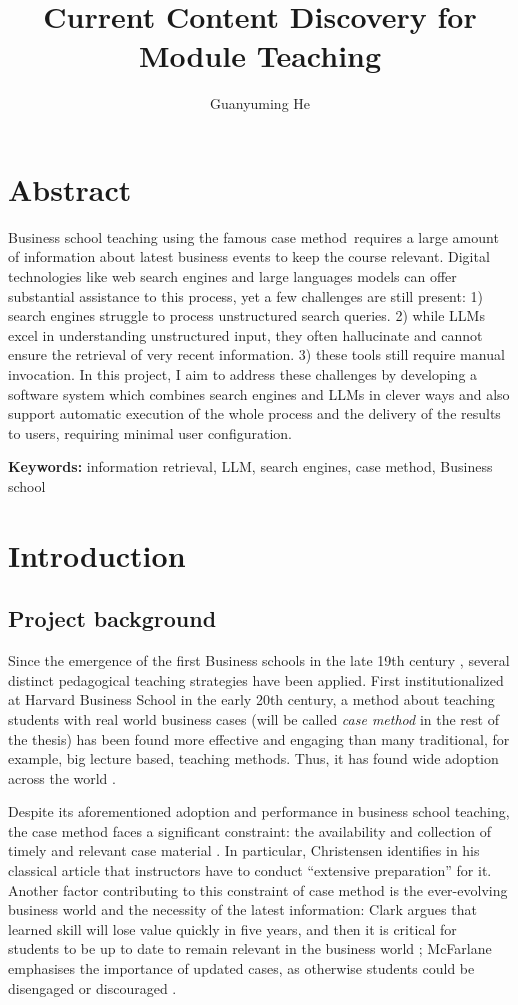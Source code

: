\documentclass[final-report]{report-template}
\title{Current Content Discovery for Module Teaching}
\author{Guanyuming He}
\newcommand\casemethod{case method}
\begin{document}
\maketitlepage  

\section*{Abstract}
Business school teaching using the famous \casemethod\ requires a large amount
of information about latest business events to keep the course relevant.
Digital technologies like web search engines and large languages models can
offer substantial assistance to this process, yet a few challenges are still
present: 1) search engines struggle to process unstructured search queries. 2)
while LLMs excel in understanding unstructured input, they often hallucinate
and cannot ensure the retrieval of very recent information. 3) these tools
still require manual invocation. In this project, I aim to address these
challenges by developing a software system which combines search engines and
LLMs in clever ways and also support automatic execution of the whole process
and the delivery of the results to users, requiring minimal user configuration.

\textbf{Keywords:} information retrieval, LLM, search
engines, \casemethod, Business school

\section{Introduction}
\subsection{Project background} \label{sec.proj.bg}
Since the emergence of the first Business schools in the late 19th century
\cite{first.bis.school.1, first.bis.school.2}, several distinct pedagogical
teaching strategies have been applied.  First institutionalized at Harvard
Business School \cite{case.method.origin.1, case.method.origin.2} in the early
20th century, a method about teaching students with real world business cases
(will be called \emph{\casemethod} in the rest of the thesis) has been found
more effective and engaging \cite{case.method.support.1, case.method.support.2,
case.method.support.3} than many traditional, for example, big lecture based,
teaching methods. Thus, it has found wide adoption across the world
\cite{case.method.adoption.1, case.method.adoption.2}.

Despite its aforementioned adoption and performance in business school
teaching, the case method faces a significant constraint: the availability and
collection of timely and relevant case material \cite{case.method.limit.1,
case.method.limit.3}. In particular, Christensen identifies in his classical
article that instructors have to conduct ``extensive preparation''
\cite{case.method.limit.2} for it. Another factor contributing to this
constraint of case method is the ever-evolving business world and the necessity
of the latest information: Clark argues that learned skill will lose
value quickly in five years, and then it is critical for students to be up to
date to remain relevant in the business world \cite{case.method.limit.4};
McFarlane emphasises the importance of updated cases, as otherwise students
could be disengaged or discouraged \cite{case.method.limit.5}.
\end{document}
